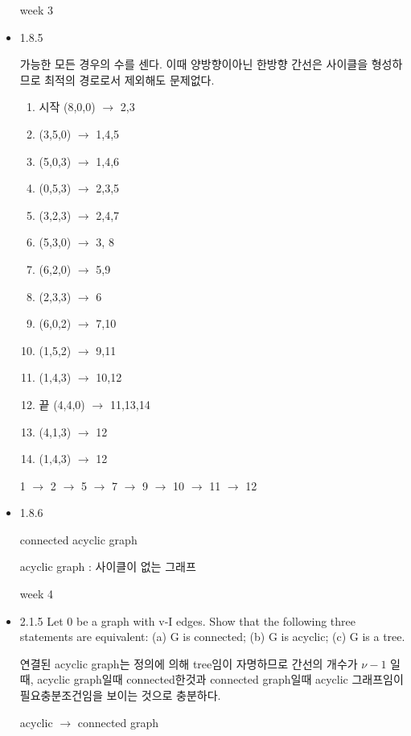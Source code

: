 \documentclass{oblivoir}
\begin{document}
\begin{itemize}
    week 3
     

    \item 1.8.5
    
    가능한 모든 경우의 수를 센다. 이때 양방향이아닌 한방향 간선은 사이클을 형성하므로 최적의 경로로서 제외해도 문제없다.

    \begin{enumerate}
        \item 시작 (8,0,0) $\rightarrow$ 2,3
        \item (3,5,0) $\rightarrow$ 1,4,5
        \item (5,0,3) $\rightarrow$ 1,4,6
        \item (0,5,3) $\rightarrow$ 2,3,5
        \item (3,2,3) $\rightarrow$ 2,4,7
        \item (5,3,0) $\rightarrow$ 3, 8
        \item (6,2,0) $\rightarrow$ 5,9
        \item (2,3,3) $\rightarrow$ 6
        \item (6,0,2) $\rightarrow$ 7,10
        \item (1,5,2) $\rightarrow$ 9,11
        \item (1,4,3) $\rightarrow$ 10,12
        \item 끝 (4,4,0) $\rightarrow$ 11,13,14
        \item (4,1,3) $\rightarrow$ 12
        \item (1,4,3) $\rightarrow$ 12
    \end{enumerate} 
    1 $\rightarrow$ 2 $\rightarrow$ 5 $\rightarrow$ 7 $\rightarrow$ 9 $\rightarrow$ 10 $\rightarrow$ 11 $\rightarrow$ 12

    \item 1.8.6
    \begin{dfn}[tree] connected acyclic graph

        acyclic graph : 사이클이 없는 그래프
    \end{dfn}

    week 4
    \item  2.1.5
    Let 0 be a graph with v-I edges. Show that the following three statements are equivalent: 
    (a) G is connected;
    (b) G is acyclic;
    (c) G is a tree.

    연결된 acyclic graph는 정의에 의해 tree임이 자명하므로 간선의 개수가 $\nu -1$  일때, acyclic graph일때 connected한것과 connected graph일때 acyclic 그래프임이 필요충분조건임을 보이는 것으로 충분하다.

    acyclic $\rightarrow$ connected graph


\end{itemize}
\end{document}
